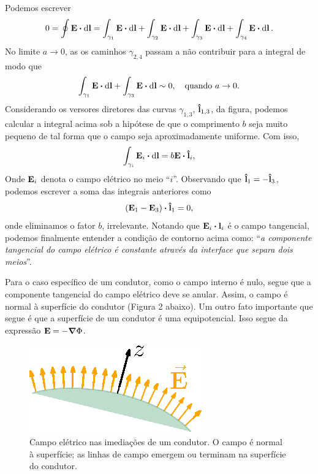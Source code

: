 Podemos escrever
\begin{equation*}
  0 = \oint \vb{E} \vdot \dd{\vb{l}} = \int_{\gamma_1} \vb{E} \vdot \dd{\vb{l}} + \int_{\gamma_2} \vb{E} \vdot \dd{\vb{l}} + \int_{\gamma_3} \vb{E} \vdot \dd{\vb{l}} + \int_{\gamma_4} \vb{E} \vdot \dd{\vb{l}}.
\end{equation*}
No limite $a \to 0$, as os caminhos $\gamma_{2,4}$ passam a não contribuir para a integral de modo que
\begin{equation*}
  \int_{\gamma_1} \vb{E} \vdot \dd{\vb{l}} + \int_{\gamma_3} \vb{E} \vdot \dd{\vb{l}} \sim 0, \quad \text{quando } a \to 0.
\end{equation*}
Considerando os versores diretores das curvas $\gamma_{1,3}$, $\vu{l}_{1,3}$, da figura, podemos calcular a integral acima sob a hipótese de que o comprimento $b$ seja muito pequeno de tal forma que o campo seja aproximadamente uniforme. Com isso,
\begin{equation*}
  \int_{\gamma_i} \vb{E}_i \vdot \dd{\vb{l}} = b \vb{E} \vdot \vu{l}_i,
\end{equation*}
Onde $\vb{E}_i$ denota o campo elétrico no meio ``$i$''.
Observando que $\vu{l}_1 = - \vu{l}_3$, podemos escrever a soma das integrais anteriores como
\begin{equation*}
  (\vb{E}_1 - \vb{E}_3) \vdot \vu{l}_1 = 0,
\end{equation*}
onde eliminamos o fator $b$, irrelevante. Notando que $\vb{E}_i \vdot \vb{l}_i$ é o campo tangencial, podemos finalmente entender a condição de contorno acima como: ``\textit{a componente tangencial do campo elétrico é constante através da interface que separa dois meios}''.

Para o caso específico de um condutor, como o campo interno é nulo, segue que a componente tangencial do campo elétrico deve se anular. Assim, o campo é normal à superfície do condutor (Figura 2 abaixo). Um outro fato importante que segue é que a superfície de um condutor é uma equipotencial. Isso segue da expressão $\vb{E} = - \grad{\Phi}$.

\begin{figure}[h]
  \center
  \includegraphics[scale = 1.1]{./imgs/surf.eps}
  \caption{Campo elétrico nas imediações de um condutor. O campo é normal à superfície; as linhas de campo emergem ou terminam na superfície do condutor.}
\end{figure}

